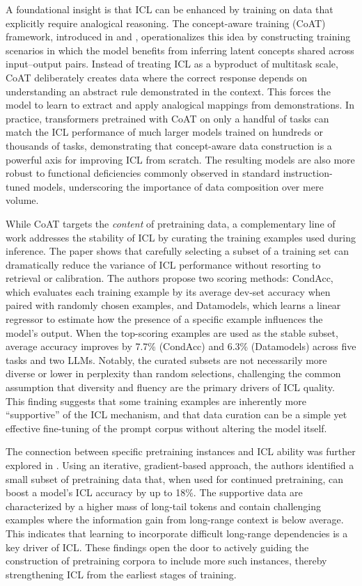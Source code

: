 \documentclass[11pt]{article}
\begin{document}
A foundational insight is that ICL can be enhanced by training on data that explicitly require analogical reasoning. The concept-aware training (CoAT) framework, introduced in \cite{ref109} and \cite{ref38}, operationalizes this idea by constructing training scenarios in which the model benefits from inferring latent concepts shared across input--output pairs. Instead of treating ICL as a byproduct of multitask scale, CoAT deliberately creates data where the correct response depends on understanding an abstract rule demonstrated in the context. This forces the model to learn to extract and apply analogical mappings from demonstrations. In practice, transformers pretrained with CoAT on only a handful of tasks can match the ICL performance of much larger models trained on hundreds or thousands of tasks, demonstrating that concept-aware data construction is a powerful axis for improving ICL from scratch. The resulting models are also more robust to functional deficiencies commonly observed in standard instruction-tuned models, underscoring the importance of data composition over mere volume.

While CoAT targets the \emph{content} of pretraining data, a complementary line of work addresses the stability of ICL by curating the training examples used during inference. The paper \cite{ref76} shows that carefully selecting a subset of a training set can dramatically reduce the variance of ICL performance without resorting to retrieval or calibration. The authors propose two scoring methods: CondAcc, which evaluates each training example by its average dev-set accuracy when paired with randomly chosen examples, and Datamodels, which learns a linear regressor to estimate how the presence of a specific example influences the model's output. When the top-scoring examples are used as the stable subset, average accuracy improves by 7.7\% (CondAcc) and 6.3\% (Datamodels) across five tasks and two LLMs. Notably, the curated subsets are not necessarily more diverse or lower in perplexity than random selections, challenging the common assumption that diversity and fluency are the primary drivers of ICL quality. This finding suggests that some training examples are inherently more ``supportive'' of the ICL mechanism, and that data curation can be a simple yet effective fine-tuning of the prompt corpus without altering the model itself.

The connection between specific pretraining instances and ICL ability was further explored in \cite{ref36}. Using an iterative, gradient-based approach, the authors identified a small subset of pretraining data that, when used for continued pretraining, can boost a model's ICL accuracy by up to 18\%. The supportive data are characterized by a higher mass of long-tail tokens and contain challenging examples where the information gain from long-range context is below average. This indicates that learning to incorporate difficult long-range dependencies is a key driver of ICL. These findings open the door to actively guiding the construction of pretraining corpora to include more such instances, thereby strengthening ICL from the earliest stages of training.
\end{document}

